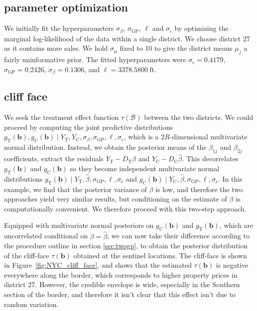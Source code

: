 \documentclass[letter]{article}
\newcommand{\treat}{\mathrm{T}}
\newcommand{\ctrol}{\mathrm{C}}
\newcommand{\sigmaf}{\sigma_{\mathrm{GP}}}
\newcommand{\sigman}{\sigma_{\epsilon}}
\newcommand{\border}{\mathcal{B}}
\newcommand{\sentinels}{\bm{b}}
\newcommand{\numsent}{R}
\begin{document}
    	\subsection{parameter optimization}\label{parameter-optimization}

We initially fit the hyperparameters \(\sigma_\beta\), \(\sigmaf\), \(\ell\) and \(\sigman\) by optimizing the marginal log-likelihood of the data within a single district. We choose district 27 as it contains more sales. We hold \(\sigma_\mu\) fixed to 10 to give the district means \(\mu_j\) a fairly uninformative prior. The fitted hyperparameters were \(\sigman=0.4179\), \(\sigmaf=0.2426\), \(\sigma_\beta=0.1306\), and \(\ell=3378.5800~\text{ft}\).
    


    	\subsection{cliff face}\label{cliff-face}

We seek the treatment effect function \(\tau(\border)\) between the two districts. We could proceed by computing the joint predictive distributions \(g_\treat{}(\sentinels),g_\ctrol{}(\sentinels) \mid Y_\treat{}, Y_\ctrol{}, \sigma_\beta,\sigmaf,\ell,\sigman\), which is a \(2 \numsent\)-dimensional multivariate normal distribution. Instead, we obtain the posterior means of the \(\beta_{1j}\) and \(\beta_{2j}\) coefficients, extract the residuals \(Y_\treat{}-D_\treat{} \hat{\beta}\) and \(Y_\ctrol{}-D_\ctrol{} \hat{\beta}\). This decorrelates \(g_\treat{}(\sentinels)\) and \(g_\ctrol{}(\sentinels)\) so they become independent multivariate normal distributions \(g_\treat{}(\sentinels) \mid Y_\treat{}, \hat\beta, \sigmaf,\ell,\sigman\) and \(g_\ctrol{}(\sentinels) \mid Y_\ctrol{}, \hat\beta, \sigmaf,\ell,\sigman\). In this example, we find that the posterior variance of \(\beta\) is low, and therefore the two approaches yield very similar results, but conditioning on the estimate of \(\beta\) is computationally convenient. We therefore proceed with this two-step approach.

Equipped with multivariate normal posteriors on \(g_\ctrol{}(\sentinels)\) and \(g_\treat{}(\sentinels)\), which are uncorrelated conditional on \(\beta=\hat\beta\), we can now take their difference according to the procedure outline in section \ref{sec:twogp}, to obtain the posterior distribution of the cliff-face \(\tau(\sentinels)\) obtained at the sentinel locations.
The cliff-face is shown in Figure~\ref{fig:NYC_cliff_face}, and shows that the estimated \(\tau(\sentinels)\) is negative everywhere along the border, which corresponds to higher property prices in district 27.
However, the credible envelope is wide, especially in the Southern section of the border, and therefore it isn't clear that this effect isn't due to random variation.
\end{document}
